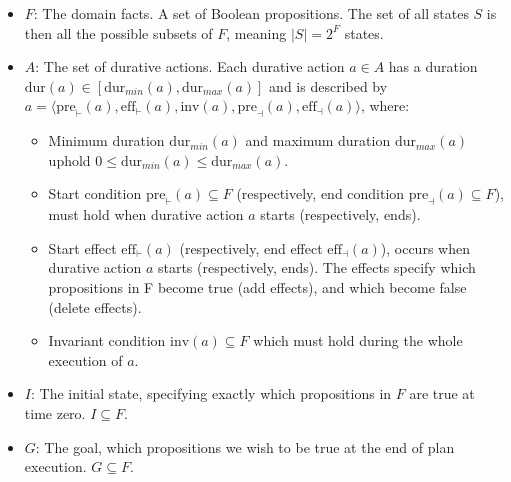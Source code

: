 \begin{itemize}
    \item $F$: The domain facts. A set of Boolean propositions. The set of all states $S$ is then all the possible subsets of $F$, meaning $\mid S \mid = 2^F$ states.
    \item $A$: The set of durative actions. Each durative action $a \in A$ 
    has a duration $\text{dur}(a) \in [\text{dur}_{min}(a), \text{dur}_{max}(a)]$ and is 
    described by \\
    $a=\langle \text{pre}_{\vdash}(a), \text{eff}_{\vdash}(a),\text{inv}(a),
    \text{pre}_{\dashv}(a), \text{eff}_{\dashv}(a)\rangle$, where:
    \begin{itemize}
        \item Minimum duration $\text{dur}_{min}(a)$ and maximum duration $\text{dur}_{max}(a)$ uphold $0 \leq \text{dur}_{min}(a) \leq \text{dur}_{max}(a)$.
        \item Start condition $\text{pre}_{\vdash}(a) \subseteq F$ (respectively, end condition $\text{pre}_{\dashv}(a)  \subseteq F$), must hold when durative action $a$ starts (respectively, ends).
        \item Start effect $\text{eff}_{\vdash}(a)$ (respectively, end effect $\text{eff}_{\dashv}(a)$), occurs when durative action $a$ starts (respectively, ends). The effects specify which propositions in F become true (add effects), and which become false (delete effects).
        \item Invariant condition $\text{inv}(a) \subseteq F$ which must hold during the whole execution of $a$.
    \end{itemize}
    \item $I$: The initial state, specifying exactly which propositions in $F$ are true at time zero. $I\subseteq F$.
    \item $G$: The goal, which propositions we wish to be true at the end of plan execution. $G \subseteq F$. 
\end{itemize}


